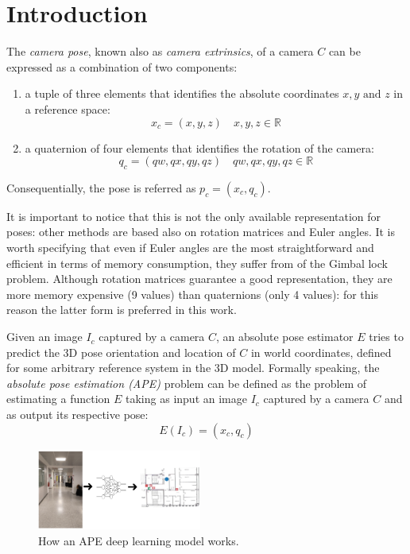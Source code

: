 \section{Introduction}
The \emph{camera pose}, known also as \emph{camera extrinsics}, of a camera $C$ can be expressed as a combination of two components:
\begin{enumerate}
    \item a tuple of three elements that identifies the absolute coordinates $x,y\text{ and }z$ in a reference space:
          \begin{equation}
              x_c=(x,y,z)\quad x,y,z \in \mathbb{R}
              \label{eq:absolute-position-definition}
          \end{equation}
    \item a quaternion of four elements that identifies the rotation of the camera:
          \begin{equation}
              q_c=(qw, qx, qy, qz)\quad qw,qx,qy,qz \in \mathbb{R}
              \label{eq:quaternion-as-rotation-definition}
          \end{equation}

\end{enumerate}
Consequentially, the pose is referred as $p_c=(x_c, q_c)$.

It is important to notice that this is not the only available representation for poses: other methods are based also on rotation matrices and Euler angles. It is worth specifying that even if Euler angles are the most straightforward and efficient in terms of memory consumption, they suffer from of the Gimbal lock problem. Although rotation matrices guarantee a good representation, they are more memory expensive (9 values) than quaternions (only 4 values): for this reason the latter form is preferred in this work.

Given an image $I_c$ captured by a camera $C$, an absolute pose estimator $E$ tries to predict the 3D pose orientation and location of $C$ in world coordinates, defined for some arbitrary reference system in the 3D model. Formally speaking, the \emph{absolute pose estimation (APE)} problem can be defined as the problem of estimating a function $E$ taking as input an image $I_c$ captured by a camera $C$ and as output its respective pose:
\begin{equation}
    E(I_c) = (x_c, q_c)
    \label{eq:absolute-pose-estimation-task}
\end{equation}

\begin{figure}[h]
    \begin{center}
        \includegraphics[width=0.48\textwidth]{./imgs/introduction_example.png}
    \end{center}
    \caption{How an APE deep learning model works.}
    \label{fig:introduction-example}
\end{figure}

